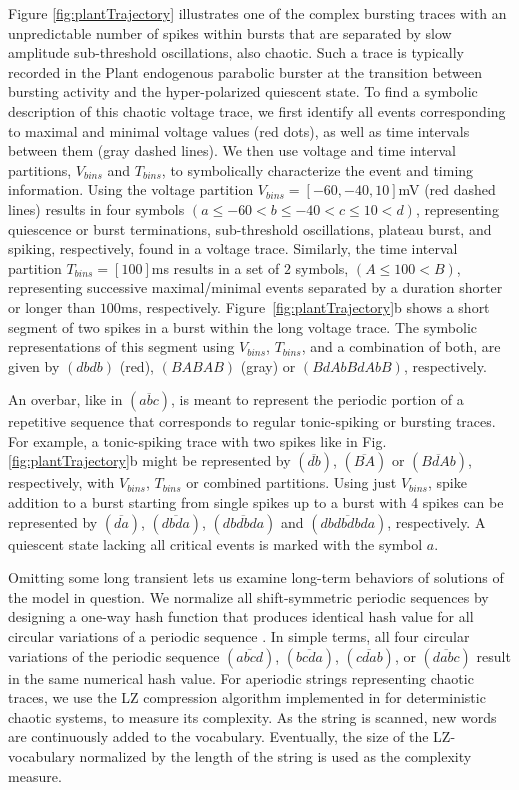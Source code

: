\documentclass{ws-book9x6}
\begin{document}
Figure \ref{fig:plantTrajectory} illustrates one of the complex bursting traces with an unpredictable number of spikes within bursts that are separated by slow amplitude sub-threshold oscillations, also chaotic. Such a trace is typically recorded in the Plant endogenous parabolic burster \cite{deniz2015} at the transition between bursting activity and the hyper-polarized quiescent state. To find a symbolic description of this chaotic voltage trace, we first identify all events corresponding to maximal and minimal voltage values (red dots), as well as time intervals between them (gray dashed lines). We then use voltage and time interval partitions, $V_{bins}$ and $T_{bins}$, to symbolically characterize the event and timing information. Using the voltage partition $V_{bins} = [-60, -40, 10]$mV (red dashed lines) results in four symbols $(a \leq -60 < b \leq -40 < c \leq 10 < d)$, representing quiescence or burst terminations, sub-threshold oscillations, plateau burst, and spiking, respectively, found in a voltage trace. Similarly, the time interval partition $T_{bins} = [100]$ms results in a set of $2$ symbols, $(A \leq 100 < B)$, representing successive maximal/minimal events separated by a duration shorter or longer than $100$ms, respectively. Figure~\ref{fig:plantTrajectory}b shows a short segment of two spikes in a burst within the long voltage trace. The symbolic representations of this segment using $V_{bins}$, $T_{bins}$, and a combination of both, are given by $(dbdb)$ (red), $(BABAB)$ (gray) or  $(BdAbBdAbB)$, respectively. 

An overbar, like in $(\overline{abc})$, is meant to represent the periodic portion of a repetitive sequence that corresponds to regular tonic-spiking or bursting traces. For example, a tonic-spiking trace with two spikes like in Fig.\ref{fig:plantTrajectory}b might be represented by $(\overline{db})$, $(\overline{BA})$ or $(\overline{BdAb})$, respectively, with $V_{bins}$, $T_{bins}$ or combined partitions. Using just $V_{bins}$, spike addition to a burst starting from single spikes up to a burst with 4 spikes can be represented by $(\overline{da})$, $(\overline{dbda})$, $(\overline{dbdbda})$ and $(\overline{dbdbdbda})$, respectively. A quiescent state lacking all critical events is marked with the symbol $a$.

Omitting some long transient lets us examine long-term behaviors of solutions of the model in question. We normalize all shift-symmetric periodic sequences by designing a one-way hash function that produces identical hash value for all circular variations of a periodic sequence \citep{perlman2016}. In simple terms, all four circular variations of the periodic sequence $(\overline{abcd})$, $(\overline{bcda})$, $(\overline{cdab})$, or $(\overline{dabc})$ result in the same numerical hash value. For aperiodic strings representing chaotic traces, we use the LZ compression algorithm implemented in \cite{pusuluri2018} for deterministic chaotic systems, to measure its complexity. As the string is scanned, new words are continuously added to the vocabulary. Eventually, the size of the LZ-vocabulary normalized by the length of the string is used as the complexity measure.
\end{document}
